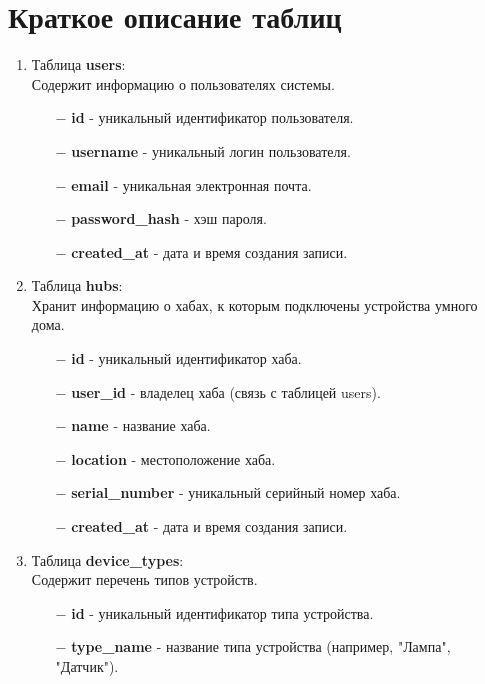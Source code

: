 \documentclass[oneside,a4paper,14pt]{extarticle}
\begin{document}
\section*{Краткое описание таблиц}
\begin{enumerate}
  \item Таблица \textbf{users}:\\
        Содержит информацию о пользователях системы.
        \begin{itemize}
          \item[$-$] \textbf{id} - уникальный идентификатор пользователя.
          \item[$-$] \textbf{username} - уникальный логин пользователя.
          \item[$-$] \textbf{email} - уникальная электронная почта.
          \item[$-$] \textbf{password\_hash} - хэш пароля.
          \item[$-$] \textbf{created\_at} - дата и время создания записи.
        \end{itemize}

  \item Таблица \textbf{hubs}:\\
        Хранит информацию о хабах, к которым подключены устройства умного дома.
        \begin{itemize}
          \item[$-$] \textbf{id} - уникальный идентификатор хаба.
          \item[$-$] \textbf{user\_id} - владелец хаба (связь с таблицей users).
          \item[$-$] \textbf{name} - название хаба.
          \item[$-$] \textbf{location} - местоположение хаба.
          \item[$-$] \textbf{serial\_number} - уникальный серийный номер хаба.
          \item[$-$] \textbf{created\_at} - дата и время создания записи.
        \end{itemize}

  \item Таблица \textbf{device\_types}:\\
        Содержит перечень типов устройств.
        \begin{itemize}
          \item[$-$] \textbf{id} - уникальный идентификатор типа устройства.
          \item[$-$] \textbf{type\_name} - название типа устройства (например, "Лампа", "Датчик").
        \end{itemize}


\end{enumerate}
\end{document}
